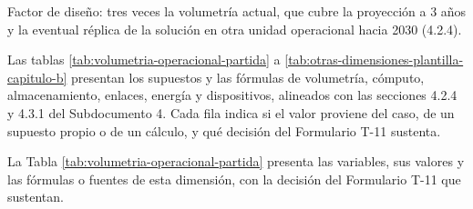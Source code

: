 \documentclass[anexo]{../../comun/overfore}
\begin{document}
Factor de diseño: tres veces la volumetría actual, que cubre la proyección a 3 años y la eventual réplica de la solución en otra unidad operacional hacia 2030 (4.2.4).

Las tablas \ref{tab:volumetria-operacional-partida} a \ref{tab:otras-dimensiones-plantilla-capitulo-b} presentan los supuestos y las fórmulas de volumetría, cómputo, almacenamiento, enlaces, energía y dispositivos, alineados con las secciones 4.2.4 y 4.3.1 del Subdocumento 4. Cada fila indica si el valor proviene del caso, de un supuesto propio o de un cálculo, y qué decisión del Formulario T-11 sustenta.

La Tabla \ref{tab:volumetria-operacional-partida} presenta las variables, sus valores y las fórmulas o fuentes de esta dimensión, con la decisión del Formulario T-11 que sustentan.
\end{document}
